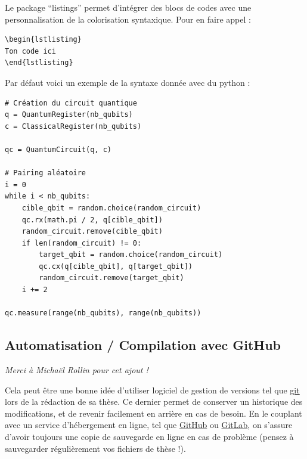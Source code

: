\noindent Le package ``listings'' permet d'intégrer des blocs de codes avec une personnalisation de la colorisation syntaxique. Pour en faire appel :
{\small \begin{verbatim}
\begin{lstlisting}
Ton code ici
\end{lstlisting}
\end{verbatim}}
\noindent Par défaut voici un exemple de la syntaxe donnée avec du python :
\begin{lstlisting}
# Création du circuit quantique
q = QuantumRegister(nb_qubits)
c = ClassicalRegister(nb_qubits)

qc = QuantumCircuit(q, c)

# Pairing aléatoire
i = 0
while i < nb_qubits:
    cible_qbit = random.choice(random_circuit)
    qc.rx(math.pi / 2, q[cible_qbit])
    random_circuit.remove(cible_qbit)
    if len(random_circuit) != 0:
        target_qbit = random.choice(random_circuit)
        qc.cx(q[cible_qbit], q[target_qbit])
        random_circuit.remove(target_qbit)
    i += 2

qc.measure(range(nb_qubits), range(nb_qubits))
\end{lstlisting}

\subsection{Automatisation / Compilation avec GitHub}
\label{chap1:sec:exemple_compilation}

\noindent\textit{Merci à Michaël Rollin pour cet ajout !}\bigskip

Cela peut être une bonne idée d'utiliser logiciel de gestion de versions tel que \href{https://git-scm.com/}{git} lors de la rédaction de sa thèse. Ce dernier permet de conserver un historique des modifications, et de revenir facilement en arrière en cas de besoin. En le couplant avec un service d'hébergement en ligne, tel que \href{https://github.com/}{GitHub} ou \href{https://gitlab.com/gitlab-org/gitlab}{GitLab}, on s'assure d'avoir toujours une copie de sauvegarde en ligne en cas de problème (pensez à sauvegarder régulièrement vos fichiers de thèse !).\bigskip 

